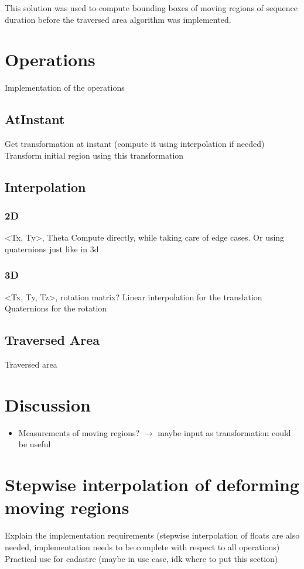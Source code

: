 	This solution was used to compute bounding boxes of moving regions of sequence duration before the traversed area algorithm was implemented.

\section{Operations}

Implementation of the operations

	\subsection{AtInstant}

	Get transformation at instant (compute it using interpolation if needed)
	Transform initial region using this transformation

	\subsection{Interpolation}

		\subsubsection{2D}

		<Tx, Ty>, Theta
		Compute directly, while taking care of edge cases.
		Or using quaternions just like in 3d

		\subsubsection{3D}

		<Tx, Ty, Tz>, rotation matrix?
		Linear interpolation for the translation
		Quaternions for the rotation

	\subsection{Traversed Area}

	Traversed area

\section{Discussion}

\begin{itemize}
	\item Measurements of moving regions? $\rightarrow$ maybe input as transformation could be useful
\end{itemize}

\section{Stepwise interpolation of deforming moving regions}

Explain the implementation requirements (stepwise interpolation of floats are also needed, implementation needs to be complete with respect to all operations)
Practical use for cadastre (maybe in use case, idk where to put this section)